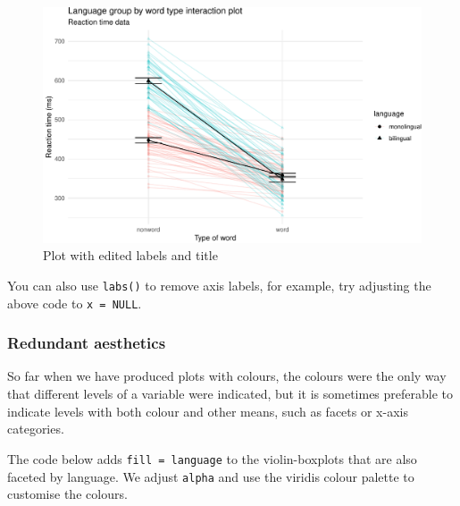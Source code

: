 \documentclass[
  english,
  doc,floatsintext]{apa6}
\begin{document}
\begin{figure}

{\centering \includegraphics[width=1\linewidth]{images/edited-labels-1} 

}

\caption{Plot with edited labels and title}\label{fig:edited-labels}
\end{figure}

You can also use \texttt{labs()} to remove axis labels, for example, try adjusting the above code to \texttt{x\ =\ NULL}.

\hypertarget{redundant-aesthetics}{%
\subsubsection{Redundant aesthetics}\label{redundant-aesthetics}}

So far when we have produced plots with colours, the colours were the only way that different levels of a variable were indicated, but it is sometimes preferable to indicate levels with both colour and other means, such as facets or x-axis categories.

The code below adds \texttt{fill\ =\ language} to the violin-boxplots that are also faceted by language. We adjust \texttt{alpha} and use the viridis colour palette to customise the colours.
\end{document}
